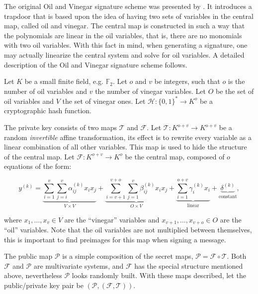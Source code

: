 \documentclass{ufsctex/ufsctex}
\begin{document}
The original Oil and Vinegar signature scheme was presented by
\cite{patarin1997ov}. It introduces a trapdoor that is based upon the idea of
having two sets of variables in the central map, called oil and vinegar. The
central map is constructed in such a way that the polynomials are linear in the
oil variables, that is, there are no monomials with two oil variables. With
this fact in mind, when generating a signature, one may actually linearize the
central system and solve for oil variables. A detailed description of the Oil
and Vinegar signature scheme follows.

Let $K$ be a small finite field, e.g. $\mathbb{F}_2$. Let $o$ and $v$ be
integers, such that $o$ is the number of oil variables and $v$ the number of
vinegar variables. Let $O$ be the set of oil variables and $V$ the set of
vinegar ones. Let $\mathcal{H}: \{0,1\}^* \to K^o$ be a cryptographic hash
function.

The private key consists of two maps $\mathcal{T}$ and $\mathcal{F}$. Let
$\mathcal{T}: K^{o+v} \to K^{o+v}$ be a random \textit{invertible} affine
transformation, its effect is to rewrite every variable as a linear combination
of all other variables. This map is used to hide the structure of the central
map. Let $\mathcal{F}: K^{o+v} \to K^{o}$ be the central map, composed of $o$
equations of the form:

\begin{equation}\label{eq:ovpolynomial}
y^{(k)} =
\underbrace{\sum_{i=1}^{v}\sum_{j=i}^{v} \alpha^{(k)}_{ij} x_i x_j}_{
V \times V} +
\underbrace{\sum_{i=v+1}^{v+o}\sum_{j=1}^{v} \beta^{(k)}_{ij} x_i x_j}_{
O \times V} +
\underbrace{\sum_{i=1}^{o+v} \gamma^{(k)}_{i} x_i}_{\text{linear}} +
\underbrace{\delta^{(k)}}_{\text{constant}},
\end{equation}

\noindent
where $x_1,\dots,x_v \in V$ are the ``vinegar'' variables and
$x_{v+1},\dots,x_{v+o} \in O$ are the ``oil'' variables. Note that the oil
variables are not multiplied between themselves, this is important to find
preimages for this map when signing a message.

The public map $\mathcal{P}$ is a simple composition of the secret maps,
$\mathcal{P} = \mathcal{F} \circ \mathcal{T}$. Both $\mathcal{F}$ and
$\mathcal{P}$ are multivariate systems, and $\mathcal{F}$ has the special
structure mentioned above, nevertheless $\mathcal{P}$ looks randomly built.
With these maps described, let the public/private key pair be
$(\mathcal{P},(\mathcal{F},\mathcal{T}))$.
\end{document}
